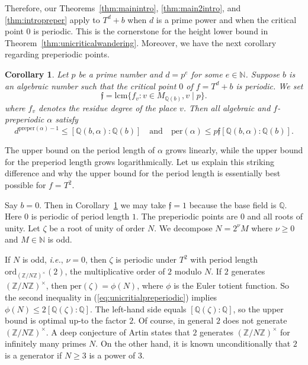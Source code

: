 \documentclass[12pt,oneside,a4]{amsart}
\newcommand{\IN}{\mathbb{N}}
\newcommand{\IQ}{\mathbb{Q}}
\newcommand{\IZ}{\mathbb{Z}}
\newcounter{maincounter}
\numberwithin{maincounter}{section}
\numberwithin{equation}{section}
\newtheorem{corollary}[maincounter]{Corollary}
\begin{document}
Therefore, our Theorems~\ref{thm:mainintro}, \ref{thm:main2intro}, and
\ref{thm:intropreper} apply to $T^{d}+b$ when $d$ is a prime power and
when the critical point $0$ is periodic.
This is the cornerstone for the height lower bound in Theorem~\ref{thm:unicriticalwandering}. 
Moreover, we  have the next corollary regarding preperiodic points. 

\begin{corollary}
  \label{cor:unicritialpreperiodic}
  Let $p$ be a prime number and $d=p^e$ for some $e\in\IN$. Suppose
  $b$ is an algebraic number such that  
  the critical point $0$ of $f = T^d + b$ is periodic.
  We set
  \begin{equation*}
    \mathfrak{f} =\mathrm{lcm}\{ f_v : v\in M_{\IQ(b)}, v\mid p\}.
  \end{equation*}
  where
  $f_v$ denotes the residue degree of the place $v$.
  Then all algebraic and $f$-preperiodic $\alpha$ satisfy
  \begin{equation}
    \label{eq:unicritialpreperiodic}
    d^{\mathrm{preper}(\alpha)-1} \le [\IQ(b,\alpha):\IQ(b)]
    \quad\text{and}\quad \mathrm{per}(\alpha) \le
    p\mathfrak{f}[\IQ(b,\alpha):\IQ(b)].
  \end{equation}
\end{corollary}

The upper bound on the period length of $\alpha$ grows linearly, while
the upper bound for the preperiod length grows logarithmically.
Let us explain this striking difference and why the upper bound
for the period length is essentially best possible for $f=T^2$.

Say $b=0$. Then in Corollary~\ref{cor:unicritialpreperiodic} we may take $\mathfrak
f=1$ because the base field is $\IQ$. Here $0$ is periodic of period
length $1$. The preperiodic points are $0$ and all roots of unity. Let
$\zeta$ be a root of unity of order $N$. We decompose $N=2^\nu M$
where $\nu\ge 0$ and $M\in\IN$ is odd.

If $N$ is odd, \textit{i.e.}, $\nu=0$, then $\zeta$ is periodic under $T^2$
with period length 
$\mathrm{ord}_{(\IZ/N\IZ)^\times}(2)$, the multiplicative order of $2$ modulo
$N$. If $2$ generates $(\IZ/N\IZ)^\times$, then $\mathrm{per}(\zeta) =
\phi(N)$, where $\phi$ is the Euler totient function.
So the second inequality in (\ref{eq:unicritialpreperiodic})
implies $\phi(N) \le 2[\IQ(\zeta):\IQ]$. The left-hand side
equals $[\IQ(\zeta):\IQ]$, so the upper bound is optimal up-to the
factor $2$. 
Of course, in general $2$ does not generate $(\IZ/N\IZ)^\times$.
A deep
conjecture of Artin states that $2$ generates $(\IZ/N\IZ)^\times$ for
infinitely many primes $N$. On the other hand, it is known
unconditionally that $2$ is a generator if $N\ge 3$ is a power of $3$. 
\end{document}
